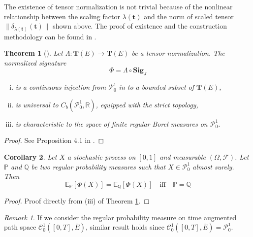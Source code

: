 \documentclass[12pt]{report}
\newtheorem{theorem}{Theorem}[chapter]
\newtheorem{corollary}[theorem]{Corollary}
\theoremstyle{definition}
\theoremstyle{remark}
\newtheorem*{remark}{Remark}
\newcommand{\R}{\mathbb{R}}
\newcommand{\E}{\mathbb{E}}
\renewcommand{\P}{\mathbb{P}}
\begin{document}
The existence of tensor normalization is not trivial because of the nonlinear relationship between the scaling factor $\lambda(\mathbf{t})$ and the norm of scaled tensor $\lVert \delta_{\lambda(\mathbf{t} )}(\mathbf{t} ) \rVert $ shown above. The proof of existence and the construction methodology can be found in \cite{chevyrev2018signature}. 
\begin{theorem}[\cite{chevyrev2018signature}]\label{moment_law}
  Let $\Lambda \colon \mathbf{T}(E) \to \mathbf{T}(E)$ be a tensor normalization. The normalized signature 
  \begin{equation}
    \Phi = \Lambda \circ \mathbf{Sig}_{J}
  \end{equation}
  \begin{enumerate}[(i)]
    \item is a continuous injection from $\mathcal{P}_{0}^{1}$ in to a bounded subset of $\mathbf{T}(E)$,
    \item is universal to $C_{b}(\mathcal{P}_{0}^{1},\R)$, equipped with the strict topology, 
    \item is characteristic to the space of finite regular Borel measures on $\mathcal{P}_{0}^{1}$.
  \end{enumerate}
\end{theorem}  
\begin{proof}
  See Proposition 4.1 in \cite{chevyrev2018signature}.
\end{proof}
\begin{corollary}\label{equalequal}
  Let $X$ a stochastic process on $[0,1]$ and measurable $(\Omega,\mathcal{F})$. Let $\P$ and $\mathbb{Q}$ be two regular probability measures such that $X \in \mathcal{P}_{0}^{1}$ almost surely. Then 
  \begin{equation}
    \E_{\P}[\Phi(X)] = \E_{\mathbb{Q}}[\Phi(X)]\quad\text{iff}\quad \P = \mathbb{Q}
  \end{equation} 
\end{corollary}
\begin{proof}
 Proof directly from (iii) of Theorem \ref{moment_law}.
\end{proof}
\begin{remark}
  If we consider the regular probability measure on time augmented path space $\mathcal{C}^{1}_{0}([0,T],\overline{E})$, similar result holds since $\mathcal{C}^{1}_{0}([0,T],\overline{E}) = \mathcal{P}_{0}^{1}$.
\end{remark}
\end{document}
